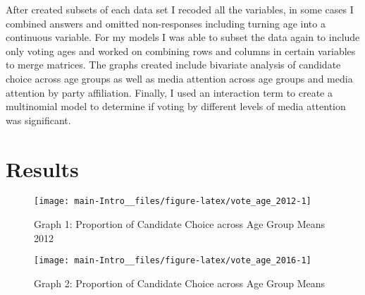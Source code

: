 \documentclass[11pt,]{article}
\begin{document}
After created subsets of each data set I recoded all the variables, in
some cases I combined answers and omitted non-responses including
turning age into a continuous variable. For my models I was able to
subset the data again to include only voting ages and worked on
combining rows and columns in certain variables to merge matrices. The
graphs created include bivariate analysis of candidate choice across age
groups as well as media attention across age groups and media attention
by party affiliation. Finally, I used an interaction term to create a
multinomial model to determine if voting by different levels of media
attention was significant.

\section{Results}\label{results}

\begin{figure}

{\centering \texttt{[image: main-Intro\_\_files/figure-latex/vote\_age\_2012-1]} 

}

\caption{Graph 1: Proportion of Candidate Choice across Age Group Means 2012}\label{fig:vote_age_2012}
\end{figure}

\begin{figure}

{\centering \texttt{[image: main-Intro\_\_files/figure-latex/vote\_age\_2016-1]} 

}

\caption{Graph 2: Proportion of Candidate Choice across Age Group Means}\label{fig:vote_age_2016}
\end{figure}
\end{document}
